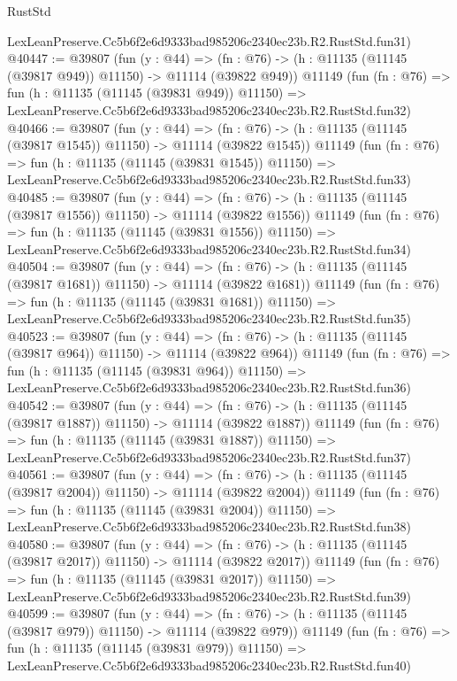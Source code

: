 \begin{lexlean}{RustStd}
\begin{coremodule}
    LexLeanPreserve.Cc5b6f2e6d9333bad985206c2340ec23b.R2.RustStd.fun31)
@40447 := @39807
    (fun (y : @44) =>
    (fn : @76) -> (h : @11135 (@11145 (@39817 @949)) @11150) -> @11114 (@39822 @949))
    @11149
    (fun (fn : @76) =>
    fun (h : @11135 (@11145 (@39831 @949)) @11150) =>
    LexLeanPreserve.Cc5b6f2e6d9333bad985206c2340ec23b.R2.RustStd.fun32)
@40466 := @39807
    (fun (y : @44) =>
    (fn : @76) -> (h : @11135 (@11145 (@39817 @1545)) @11150) -> @11114 (@39822 @1545))
    @11149
    (fun (fn : @76) =>
    fun (h : @11135 (@11145 (@39831 @1545)) @11150) =>
    LexLeanPreserve.Cc5b6f2e6d9333bad985206c2340ec23b.R2.RustStd.fun33)
@40485 := @39807
    (fun (y : @44) =>
    (fn : @76) -> (h : @11135 (@11145 (@39817 @1556)) @11150) -> @11114 (@39822 @1556))
    @11149
    (fun (fn : @76) =>
    fun (h : @11135 (@11145 (@39831 @1556)) @11150) =>
    LexLeanPreserve.Cc5b6f2e6d9333bad985206c2340ec23b.R2.RustStd.fun34)
@40504 := @39807
    (fun (y : @44) =>
    (fn : @76) -> (h : @11135 (@11145 (@39817 @1681)) @11150) -> @11114 (@39822 @1681))
    @11149
    (fun (fn : @76) =>
    fun (h : @11135 (@11145 (@39831 @1681)) @11150) =>
    LexLeanPreserve.Cc5b6f2e6d9333bad985206c2340ec23b.R2.RustStd.fun35)
@40523 := @39807
    (fun (y : @44) =>
    (fn : @76) -> (h : @11135 (@11145 (@39817 @964)) @11150) -> @11114 (@39822 @964))
    @11149
    (fun (fn : @76) =>
    fun (h : @11135 (@11145 (@39831 @964)) @11150) =>
    LexLeanPreserve.Cc5b6f2e6d9333bad985206c2340ec23b.R2.RustStd.fun36)
@40542 := @39807
    (fun (y : @44) =>
    (fn : @76) -> (h : @11135 (@11145 (@39817 @1887)) @11150) -> @11114 (@39822 @1887))
    @11149
    (fun (fn : @76) =>
    fun (h : @11135 (@11145 (@39831 @1887)) @11150) =>
    LexLeanPreserve.Cc5b6f2e6d9333bad985206c2340ec23b.R2.RustStd.fun37)
@40561 := @39807
    (fun (y : @44) =>
    (fn : @76) -> (h : @11135 (@11145 (@39817 @2004)) @11150) -> @11114 (@39822 @2004))
    @11149
    (fun (fn : @76) =>
    fun (h : @11135 (@11145 (@39831 @2004)) @11150) =>
    LexLeanPreserve.Cc5b6f2e6d9333bad985206c2340ec23b.R2.RustStd.fun38)
@40580 := @39807
    (fun (y : @44) =>
    (fn : @76) -> (h : @11135 (@11145 (@39817 @2017)) @11150) -> @11114 (@39822 @2017))
    @11149
    (fun (fn : @76) =>
    fun (h : @11135 (@11145 (@39831 @2017)) @11150) =>
    LexLeanPreserve.Cc5b6f2e6d9333bad985206c2340ec23b.R2.RustStd.fun39)
@40599 := @39807
    (fun (y : @44) =>
    (fn : @76) -> (h : @11135 (@11145 (@39817 @979)) @11150) -> @11114 (@39822 @979))
    @11149
    (fun (fn : @76) =>
    fun (h : @11135 (@11145 (@39831 @979)) @11150) =>
    LexLeanPreserve.Cc5b6f2e6d9333bad985206c2340ec23b.R2.RustStd.fun40)

\end{coremodule}
\end{lexlean}
